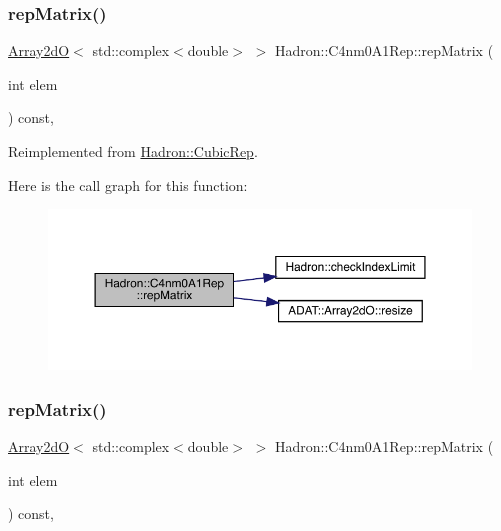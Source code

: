 \subsubsection{\texorpdfstring{repMatrix()}{repMatrix()}\hspace{0.1cm}{\footnotesize\ttfamily [1/2]}}
{\footnotesize\ttfamily \mbox{\hyperlink{classADAT_1_1Array2dO}{Array2dO}}$<$ std\+::complex$<$double$>$ $>$ Hadron\+::\+C4nm0\+A1\+Rep\+::rep\+Matrix (\begin{DoxyParamCaption}\item[{int}]{elem }\end{DoxyParamCaption}) const\hspace{0.3cm}{\ttfamily [inline]}, {\ttfamily [virtual]}}



Reimplemented from \mbox{\hyperlink{structHadron_1_1CubicRep_ac5d7e9e6f4ab1158b5fce3e4ad9e8005}{Hadron\+::\+Cubic\+Rep}}.

Here is the call graph for this function\+:
\nopagebreak
\begin{figure}[H]
\begin{center}
\leavevmode
\includegraphics[width=350pt]{d8/d28/structHadron_1_1C4nm0A1Rep_a18af771ed96478090f052459dd7a70da_cgraph}
\end{center}
\end{figure}
\mbox{\label{structHadron_1_1C4nm0A1Rep_a18af771ed96478090f052459dd7a70da}} 
\subsubsection{\texorpdfstring{repMatrix()}{repMatrix()}\hspace{0.1cm}{\footnotesize\ttfamily [2/2]}}
{\footnotesize\ttfamily \mbox{\hyperlink{classADAT_1_1Array2dO}{Array2dO}}$<$ std\+::complex$<$double$>$ $>$ Hadron\+::\+C4nm0\+A1\+Rep\+::rep\+Matrix (\begin{DoxyParamCaption}\item[{int}]{elem }\end{DoxyParamCaption}) const\hspace{0.3cm}{\ttfamily [inline]}, {\ttfamily [virtual]}}



